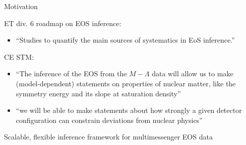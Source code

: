 \documentclass[usenames,dvipsnames,t]{beamer}
\newcommand{\thetaeos}{\boldsymbol{\theta}_{\rm{EOS}}}
\begin{document}
\begin{frame}{Motivation}
  \def\x{4mm}
  \def\y{2mm}

  ET div. 6 roadmap on EOS inference:
  \begin{itemize}
    \item ``Studies to quantify the main sources of systematics in EoS inference.''
  \end{itemize}

  \vspace{\x}

  CE STM:
  \begin{itemize}
    \item ``The inference of the EOS from the $M-\Lambda$ data will allow us to make (model-dependent) statements on properties of nuclear matter, like the symmetry energy and its slope at saturation density''

    \vspace{\y}

    \item ``we will be able to make statements about how strongly a given detector configuration can constrain deviations from nuclear physics''
  \end{itemize}

  \pause
  \vspace{3mm}

  \begin{tcolorbox}[colback=blue!5!white,colframe=blue!75!black,title=Need]
      Scalable, flexible inference framework for multimessenger EOS data
  \end{tcolorbox}

\end{frame}




\end{document}
